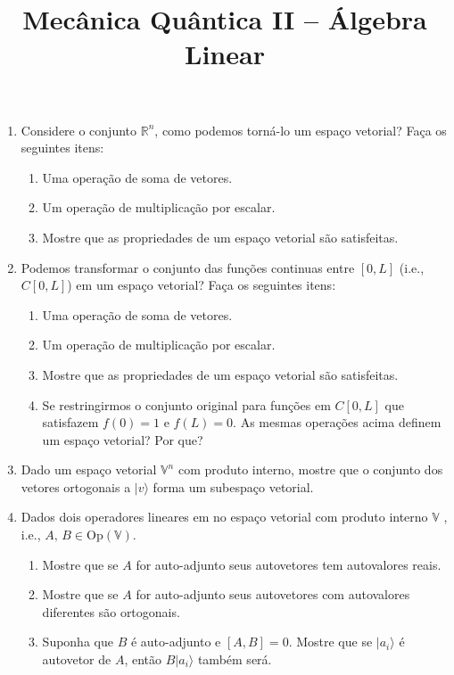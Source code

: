 \newif\ifuseseminar
\useseminartrue


\title{Mecânica Quântica II -- Álgebra Linear}


\begin{enumerate}
	\item Considere o conjunto $\mathbb{R}^n$, como podemos torná-lo um espaço vetorial?
	      Faça os seguintes itens:
	      \begin{enumerate}
		      \item Uma operação de soma de vetores.
		      \item Um operação de multiplicação por escalar.
		      \item Mostre que as propriedades de um espaço vetorial são satisfeitas.
	      \end{enumerate}
	\item Podemos transformar o conjunto das funções continuas entre $[0,L]$ (i.e.,
	      $C[0,L]$) em um espaço vetorial? Faça os seguintes itens:
	      \begin{enumerate}
		      \item Uma operação de soma de vetores.
		      \item Um operação de multiplicação por escalar.
		      \item Mostre que as propriedades de um espaço vetorial são satisfeitas.
		      \item Se restringirmos o conjunto original para funções em $C[0,L]$ que
		            satisfazem $f(0) = 1$ e $f(L) = 0$. As mesmas operações acima definem um
		            espaço vetorial? Por que?
	      \end{enumerate}
	\item Dado um espaço vetorial $\mathbb{V}^n$ com produto interno, mostre que o
	      conjunto dos vetores ortogonais a $|v\rangle$ forma um subespaço vetorial.
	\item Dados dois operadores lineares em no espaço vetorial com produto interno
	      $\mathbb{V}$ , i.e., $A,\,B\in \mathrm{Op}(\mathbb{V})$.
	      \begin{enumerate}
		      \item Mostre que se $A$ for auto-adjunto seus autovetores tem autovalores
		            reais.
		      \item Mostre que se $A$ for auto-adjunto seus autovetores com autovalores
		            diferentes são ortogonais.
		      \item Suponha que $B$ é auto-adjunto e $[A,B] = 0$. Mostre que se
		            $|a_i\rangle$ é autovetor de $A$, então $B|a_i\rangle$ também será.
	      \end{enumerate}

\end{enumerate}


